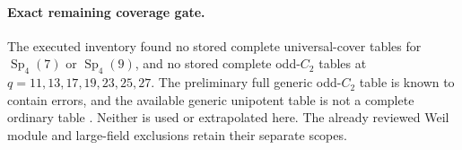 \paragraph{Exact remaining coverage gate.}
The executed inventory found no stored complete universal-cover tables
for $\operatorname{Sp}_4(7)$ or $\operatorname{Sp}_4(9)$, and no stored
complete odd-$C_2$ tables at $q=11,13,17,19,23,25,27$.
The preliminary full generic odd-$C_2$ table is known to contain errors,
and the available generic unipotent table is not a complete ordinary
table \cite{OC2:GCT}. Neither is used or extrapolated here. The already reviewed Weil
module and large-field exclusions retain their separate scopes.
